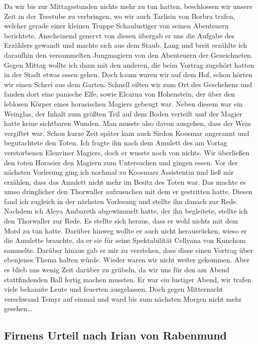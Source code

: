 Da wir bis zur Mittagsstunden nichts mehr zu tun hatten, beschlossen wir unsere Zeit in der Teestube zu verbringen, wo wir auch Tarlisin von Borbra trafen, welcher gerade einer kleinen Truppe Schaulustiger von seinen Abenteuern berichtete. Anscheinend genervt von diesen übergab er uns die Aufgabe des Erzählers gewandt und machte sich aus dem Staub. Lang und breit erzählte ich daraufhin den versammelten Jungmagiern von den Abenteuern der Gezeichneten. Gegen Mittag wollte ich dann mit den anderen, die beim Vortrag zugehört hatten in der Stadt etwas essen gehen. Doch kaum waren wir auf dem Hof, schon hörten wir einen Schrei aus dem Garten. Schnell eilten wir zum Ort des Geschehens und fanden dort eine panische Elfe, sowie Elcarna von Hohenstein, der über den leblosen Körper eines horasischen Magiers gebeugt war. Neben diesem war ein Weinglas, der Inhalt zum größten Teil auf dem Boden verteilt und der Magier hatte keine sichtbaren Wunden. Man musste also davon ausgehen, dass der Wein vergiftet war. Schon kurze Zeit später kam auch Sirdon Koosmar angerannt und begutachtete den Toten. Ich fragte ihn nach dem Amulett des am Vortag verstorbenen Elenviner Magiers, doch er wusste noch von nichts. Wir überließen den toten Horasier den Magiern zum Untersuchen und gingen essen. Vor der nächsten Vorlesung ging ich nochmal zu Koosmars Assistentin und ließ mir erzählen, dass das Amulett nicht mehr im Besitz des Toten war. Das machte es umso dringlicher den Thorwaller aufzusuchen mit dem er gestritten hatte. Diesen fand ich zugleich in der nächsten Vorlesung und stellte ihn danach zur Rede. Nachdem ich Aleya Ambareth abgewimmelt hatte, der ihn begleitete, stellte ich den Thorwaller zur Rede. Es stellte sich heraus, dass er wohl nichts mit dem Mord zu tun hatte. Darüber hinweg wollte er auch nicht herausrücken, wieso er die Amulette brauchte, da er sie für seine Spektabilität Cellyana von Kunchom sammelte. Darüber hinaus gab er mir zu verstehen, dass diese einen Vortrag über ebenjenes Thema halten würde. Wieder waren wir nicht weiter gekommen. Aber es blieb uns wenig Zeit darüber zu grübeln, da wir uns für den am Abend stattfindenden Ball fertig machen mussten. Er war ein lustiger Abend, wir trafen viele bekannte Leute und feuerten ausgelassen. Doch gegen Mitternacht verschwand Temyr auf einmal und ward bis zum nächsten Morgen nicht mehr gesehen\dots

\subsection{Firnens Urteil nach Irian von Rabenmund}
